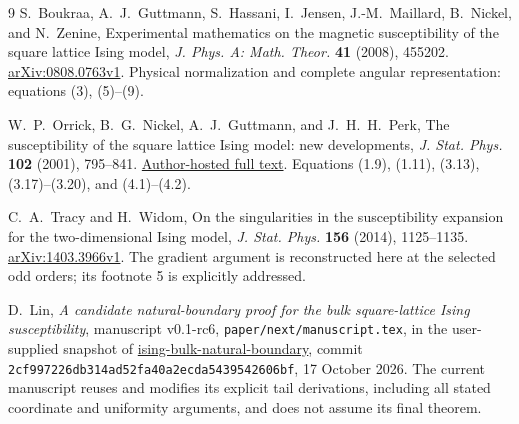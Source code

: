 \documentclass[11pt]{article}
\numberwithin{equation}{section}
\theoremstyle{definition}
\begin{document}
\begin{thebibliography}{9}
S.~Boukraa, A.~J.~Guttmann, S.~Hassani, I.~Jensen,
J.-M.~Maillard, B.~Nickel, and N.~Zenine,
Experimental mathematics on the magnetic susceptibility of the
square lattice Ising model,
\emph{J. Phys. A: Math. Theor.} \textbf{41} (2008), 455202.
\href{https://arxiv.org/abs/0808.0763}{arXiv:0808.0763v1}.
Physical normalization and complete angular representation:
equations (3), (5)--(9).

W.~P.~Orrick, B.~G.~Nickel, A.~J.~Guttmann, and J.~H.~H.~Perk,
The susceptibility of the square lattice Ising model: new developments,
\emph{J. Stat. Phys.} \textbf{102} (2001), 795--841.
\href{https://perk.okstate.edu/papers/canberra/chitex.pdf}{Author-hosted full text}.
Equations (1.9), (1.11), (3.13), (3.17)--(3.20), and (4.1)--(4.2).

C.~A.~Tracy and H.~Widom,
On the singularities in the susceptibility expansion for the
two-dimensional Ising model,
\emph{J. Stat. Phys.} \textbf{156} (2014), 1125--1135.
\href{https://arxiv.org/abs/1403.3966}{arXiv:1403.3966v1}.
The gradient argument is reconstructed here at the selected odd
orders; its footnote 5 is explicitly addressed.

D.~Lin, \emph{A candidate natural-boundary proof for the bulk
square-lattice Ising susceptibility}, manuscript v0.1-rc6,
\texttt{paper/next/manuscript.tex}, in the user-supplied snapshot of
\href{https://github.com/LeoLam233/ising-bulk-natural-boundary}{ising-bulk-natural-boundary},
commit \texttt{2cf997226db314ad52fa40a2ecda5439542606bf},
17 October 2026. The current manuscript reuses and modifies its
explicit tail derivations, including all stated coordinate and
uniformity arguments, and does not assume its final theorem.
\end{thebibliography}
\end{document}
